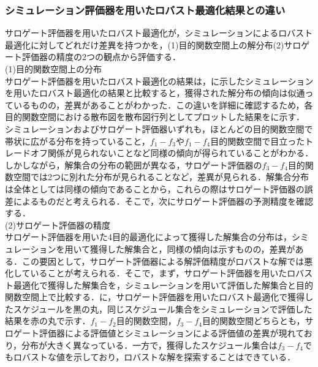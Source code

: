 \subsubsection{シミュレーション評価器を用いたロバスト最適化結果との違い}
サロゲート評価器を用いたロバスト最適化が，シミュレーションによるロバスト最適化に対してどれだけ差異を持つかを，(1)目的関数空間上の解分布(2)サロゲート評価器の精度の2つの観点から評価する．\\
(1)目的関数空間上の分布\\
サロゲート評価器を用いたロバスト最適化の結果は，に示したシミュレーションを用いたロバスト最適化の結果と比較すると，獲得された解分布の傾向は似通っているものの，差異があることがわかった．この違いを詳細に確認するため，各目的関数空間における散布図を散布図行列としてプロットした結果をに示す．
シミュレーションおよびサロゲート評価器いずれも，ほとんどの目的関数空間で帯状に広がる分布を持っていること，$f_1-f_3$や$f_1-f_4$目的関数空間で目立ったトレードオフ関係が見られないことなど同様の傾向が得られていることがわかる．しかしながら，解集合の分布の範囲が異なる，サロゲート評価器の$f_3-f_4$目的関数空間では2つに別れた分布が見られることなど，差異が見られる．解集合分布は全体としては同様の傾向であることから，これらの際はサロゲート評価器の誤差によるものだと考えられる．そこで，次にサロゲート評価器の予測精度を確認する．\\
(2)サロゲート評価器の精度\\
サロゲート評価器を用いた4目的最適化によって獲得した解集合の分布は，シミュレーションを用いて獲得した解集合と，同様の傾向は示すものの，差異がある．この要因として，サロゲート評価器による解評価精度がロバストな解では悪化していることが考えられる．そこで，まず，サロゲート評価器を用いたロバスト最適化で獲得した解集合を，シミュレーションを用いて評価した解集合と目的関数空間上で比較する．に，サロゲート評価器を用いたロバスト最適化で獲得したスケジュールを黒の丸，同じスケジュール集合をシミュレーションで評価した結果を赤の丸で示す．$f_1-f_2$目的関数空間，$f_3-f_4$目的関数空間どちらとも，サロゲート評価器による評価値とシミュレーションによる評価値の差異が現れており，分布が大きく異なっている．一方で，獲得したスケジュール集合は$f_3-f_4$でもロバストな値を示しており，ロバストな解を探索することはできている．

